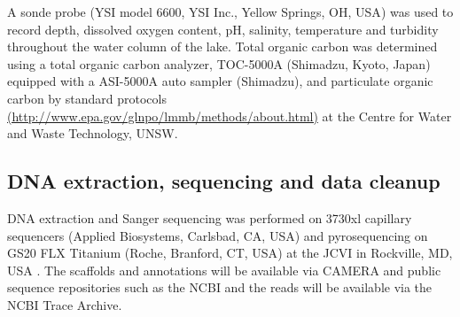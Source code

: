 
A sonde probe (\textsc{YSI} model 6600, \textsc{YSI} Inc., Yellow Springs, \textsc{OH}, \textsc{USA}) was used to record depth, dissolved oxygen content, pH, salinity, temperature and turbidity throughout the water column of the lake. 
Total organic carbon was determined using a total organic carbon analyzer, TOC-5000A (Shimadzu, Kyoto, Japan) equipped with a \textsc{ASI}-5000A auto sampler (Shimadzu), and particulate organic carbon by standard protocols 
\url{(http://www.epa.gov/glnpo/lmmb/methods/about.html)} 
at the Centre for Water and Waste Technology, \textsc{UNSW}.

\subsection{\textsc{DNA} extraction, sequencing and data cleanup}
\textsc{DNA} extraction and Sanger sequencing was performed on 3730xl capillary sequencers (Applied Biosystems, Carlsbad, \textsc{CA}, \textsc{USA}) and pyrosequencing on \textsc{GS20 FLX} Titanium (Roche, Branford, \textsc{CT}, \textsc{USA}) at the \acl{JCVI} in Rockville, \textsc{MD}, \textsc{USA} \cite{Rusch2007}. 
The scaffolds and annotations will be available via \ac{CAMERA} and public sequence repositories such as the \ac{NCBI} and the reads will be available via the \ac{NCBI} Trace Archive. 

